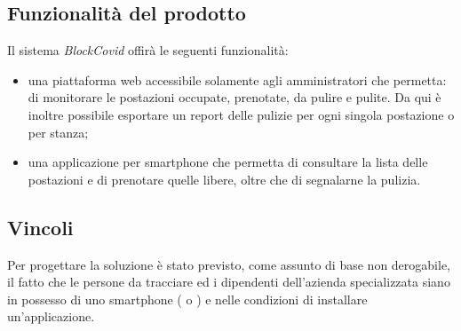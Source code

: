 \subsection{Funzionalit\`{a} del prodotto}
Il sistema \emph{BlockCovid} offir\`{a} le seguenti funzionalit\`{a}:
\begin{itemize}
    \item una piattaforma web accessibile solamente agli amministratori che permetta: di monitorare le postazioni occupate, prenotate, da pulire e pulite. Da qui \`{e} inoltre possibile esportare un report delle pulizie per ogni singola postazione o per stanza;
    \item una applicazione per smartphone che permetta di consultare la lista delle postazioni e di prenotare quelle libere, oltre che di segnalarne la pulizia.
\end{itemize}

\subsection{Vincoli}
Per progettare la soluzione è stato previsto, come assunto di base non derogabile, il fatto che le persone
da tracciare ed i dipendenti dell’azienda specializzata siano in possesso di uno smartphone ( o ) e nelle condizioni di installare un’applicazione.
